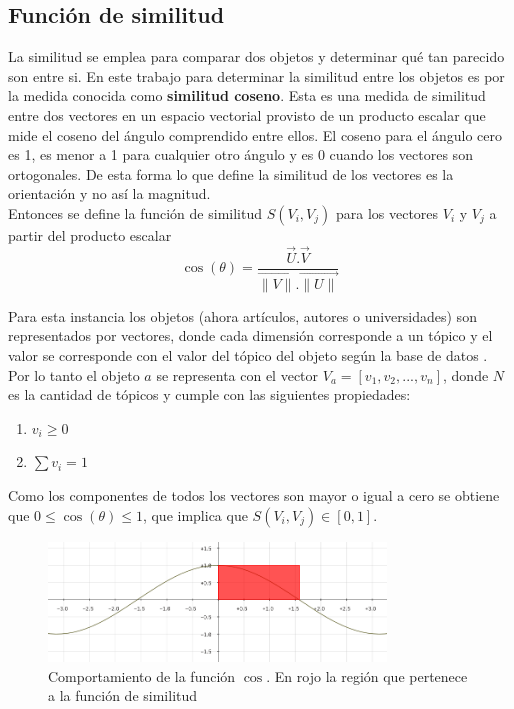 \subsection{Función de similitud}
La similitud se emplea para comparar dos objetos y determinar qué tan parecido son entre si. En este trabajo para determinar la similitud entre los objetos es por la medida conocida como \textbf{similitud coseno}. Esta es una medida de similitud entre dos vectores en un espacio vectorial provisto de un producto escalar que mide el coseno del ángulo comprendido entre ellos. El coseno para el ángulo cero es 1, es menor a 1 para cualquier otro ángulo y es 0 cuando los vectores son ortogonales. De esta forma lo que define la similitud de los vectores es la orientación y no así la magnitud.\\
Entonces se define la función de similitud $S(V_i, V_j)$ para los vectores $V_i$ y $V_j$ a partir del producto escalar\\

\begin{equation} \label{eq:angulovectorial}
\cos(\theta) =  \dfrac{\overrightarrow{U} . \overrightarrow{V}}{\overrightarrow{\lVert V\lVert}.\overrightarrow{\lVert U\lVert}}
\end{equation}

Para esta instancia los objetos (ahora artículos, autores o universidades) son representados por vectores, donde cada dimensión corresponde a un tópico y el valor se corresponde con el valor del tópico del objeto según la base de datos \cite{dataDrive}. Por lo tanto el objeto $a$ se representa con el vector $V_a = [v_1,v_2,...,v_n]$, donde $N$ es la cantidad de tópicos y cumple con las siguientes propiedades:
\begin{enumerate}
 \item $v_i \geq 0$
 \item $\sum{v_i} = 1$
\end{enumerate}

Como los componentes de todos los vectores son mayor o igual a cero se obtiene que $0\leq\cos(\theta)\leq1$, que implica que $S(V_i, V_j) \in \left[0, 1\right]$.\\

\begin{figure}[H]
\includegraphics[width=0.8\textwidth]{img/coseno.png}
\caption{Comportamiento de la función $\cos$. En rojo la región que pertenece a la función de similitud}
\label{bus:img-coseno}
\end{figure}

